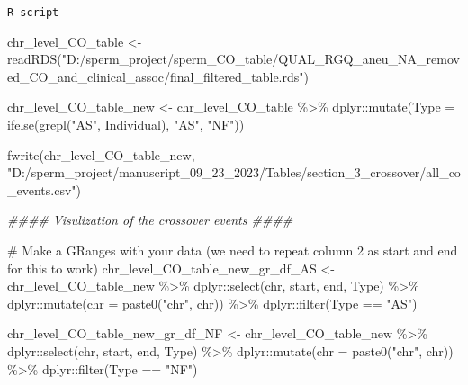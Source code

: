\documentclass[
  letterpaper,
  DIV=11,
  numbers=noendperiod]{scrreprt}
\newenvironment{Shaded}{\begin{snugshade}}{\end{snugshade}}
\newcommand{\AttributeTok}[1]{\textcolor[rgb]{0.40,0.45,0.13}{#1}}
\newcommand{\CommentTok}[1]{\textcolor[rgb]{0.37,0.37,0.37}{#1}}
\newcommand{\DocumentationTok}[1]{\textcolor[rgb]{0.37,0.37,0.37}{\textit{#1}}}
\newcommand{\FunctionTok}[1]{\textcolor[rgb]{0.28,0.35,0.67}{#1}}
\newcommand{\NormalTok}[1]{\textcolor[rgb]{0.00,0.23,0.31}{#1}}
\newcommand{\OtherTok}[1]{\textcolor[rgb]{0.00,0.23,0.31}{#1}}
\newcommand{\SpecialCharTok}[1]{\textcolor[rgb]{0.37,0.37,0.37}{#1}}
\newcommand{\StringTok}[1]{\textcolor[rgb]{0.13,0.47,0.30}{#1}}
\begin{document}
\begin{codelisting}

\caption{\texttt{R script}}

\begin{Shaded}
\begin{Highlighting}[]
\NormalTok{chr\_level\_CO\_table }\OtherTok{\textless{}{-}} \FunctionTok{readRDS}\NormalTok{(}\StringTok{"D:/sperm\_project/sperm\_CO\_table/QUAL\_RGQ\_aneu\_NA\_removed\_CO\_and\_clinical\_assoc/final\_filtered\_table.rds"}\NormalTok{)}

\NormalTok{chr\_level\_CO\_table\_new }\OtherTok{\textless{}{-}}\NormalTok{ chr\_level\_CO\_table }\SpecialCharTok{\%\textgreater{}\%}\NormalTok{ dplyr}\SpecialCharTok{::}\FunctionTok{mutate}\NormalTok{(}\AttributeTok{Type =} \FunctionTok{ifelse}\NormalTok{(}\FunctionTok{grepl}\NormalTok{(}\StringTok{"AS"}\NormalTok{, Individual), }\StringTok{"AS"}\NormalTok{, }\StringTok{"NF"}\NormalTok{))}

\FunctionTok{fwrite}\NormalTok{(chr\_level\_CO\_table\_new, }\StringTok{"D:/sperm\_project/manuscript\_09\_23\_2023/Tables/section\_3\_crossover/all\_co\_events.csv"}\NormalTok{)}

\DocumentationTok{\#\#\#\# Visulization of the crossover events \#\#\#\#}

\CommentTok{\# Make a GRanges with your data (we need to repeat column 2 as start and end for this to work)}
\NormalTok{chr\_level\_CO\_table\_new\_gr\_df\_AS }\OtherTok{\textless{}{-}}\NormalTok{ chr\_level\_CO\_table\_new }\SpecialCharTok{\%\textgreater{}\%}\NormalTok{ dplyr}\SpecialCharTok{::}\FunctionTok{select}\NormalTok{(chr, start, end, Type) }\SpecialCharTok{\%\textgreater{}\%}\NormalTok{ dplyr}\SpecialCharTok{::}\FunctionTok{mutate}\NormalTok{(}\AttributeTok{chr =} \FunctionTok{paste0}\NormalTok{(}\StringTok{"chr"}\NormalTok{, chr)) }\SpecialCharTok{\%\textgreater{}\%}\NormalTok{ dplyr}\SpecialCharTok{::}\FunctionTok{filter}\NormalTok{(Type }\SpecialCharTok{==} \StringTok{"AS"}\NormalTok{)}

\NormalTok{chr\_level\_CO\_table\_new\_gr\_df\_NF }\OtherTok{\textless{}{-}}\NormalTok{ chr\_level\_CO\_table\_new }\SpecialCharTok{\%\textgreater{}\%}\NormalTok{ dplyr}\SpecialCharTok{::}\FunctionTok{select}\NormalTok{(chr, start, end, Type) }\SpecialCharTok{\%\textgreater{}\%}\NormalTok{ dplyr}\SpecialCharTok{::}\FunctionTok{mutate}\NormalTok{(}\AttributeTok{chr =} \FunctionTok{paste0}\NormalTok{(}\StringTok{"chr"}\NormalTok{, chr)) }\SpecialCharTok{\%\textgreater{}\%}\NormalTok{ dplyr}\SpecialCharTok{::}\FunctionTok{filter}\NormalTok{(Type }\SpecialCharTok{==} \StringTok{"NF"}\NormalTok{)}


\end{Highlighting}
\end{Shaded}
\end{codelisting}
\end{document}
